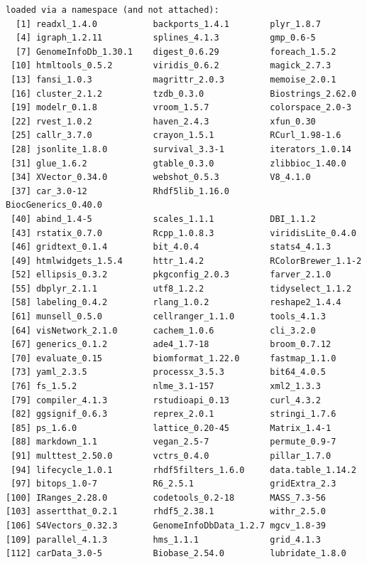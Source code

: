 \documentclass[
  12pt,
  openany]{book}
\begin{document}
\begin{verbatim}
loaded via a namespace (and not attached):
  [1] readxl_1.4.0           backports_1.4.1        plyr_1.8.7            
  [4] igraph_1.2.11          splines_4.1.3          gmp_0.6-5             
  [7] GenomeInfoDb_1.30.1    digest_0.6.29          foreach_1.5.2         
 [10] htmltools_0.5.2        viridis_0.6.2          magick_2.7.3          
 [13] fansi_1.0.3            magrittr_2.0.3         memoise_2.0.1         
 [16] cluster_2.1.2          tzdb_0.3.0             Biostrings_2.62.0     
 [19] modelr_0.1.8           vroom_1.5.7            colorspace_2.0-3      
 [22] rvest_1.0.2            haven_2.4.3            xfun_0.30             
 [25] callr_3.7.0            crayon_1.5.1           RCurl_1.98-1.6        
 [28] jsonlite_1.8.0         survival_3.3-1         iterators_1.0.14      
 [31] glue_1.6.2             gtable_0.3.0           zlibbioc_1.40.0       
 [34] XVector_0.34.0         webshot_0.5.3          V8_4.1.0              
 [37] car_3.0-12             Rhdf5lib_1.16.0        BiocGenerics_0.40.0   
 [40] abind_1.4-5            scales_1.1.1           DBI_1.1.2             
 [43] rstatix_0.7.0          Rcpp_1.0.8.3           viridisLite_0.4.0     
 [46] gridtext_0.1.4         bit_4.0.4              stats4_4.1.3          
 [49] htmlwidgets_1.5.4      httr_1.4.2             RColorBrewer_1.1-2    
 [52] ellipsis_0.3.2         pkgconfig_2.0.3        farver_2.1.0          
 [55] dbplyr_2.1.1           utf8_1.2.2             tidyselect_1.1.2      
 [58] labeling_0.4.2         rlang_1.0.2            reshape2_1.4.4        
 [61] munsell_0.5.0          cellranger_1.1.0       tools_4.1.3           
 [64] visNetwork_2.1.0       cachem_1.0.6           cli_3.2.0             
 [67] generics_0.1.2         ade4_1.7-18            broom_0.7.12          
 [70] evaluate_0.15          biomformat_1.22.0      fastmap_1.1.0         
 [73] yaml_2.3.5             processx_3.5.3         bit64_4.0.5           
 [76] fs_1.5.2               nlme_3.1-157           xml2_1.3.3            
 [79] compiler_4.1.3         rstudioapi_0.13        curl_4.3.2            
 [82] ggsignif_0.6.3         reprex_2.0.1           stringi_1.7.6         
 [85] ps_1.6.0               lattice_0.20-45        Matrix_1.4-1          
 [88] markdown_1.1           vegan_2.5-7            permute_0.9-7         
 [91] multtest_2.50.0        vctrs_0.4.0            pillar_1.7.0          
 [94] lifecycle_1.0.1        rhdf5filters_1.6.0     data.table_1.14.2     
 [97] bitops_1.0-7           R6_2.5.1               gridExtra_2.3         
[100] IRanges_2.28.0         codetools_0.2-18       MASS_7.3-56           
[103] assertthat_0.2.1       rhdf5_2.38.1           withr_2.5.0           
[106] S4Vectors_0.32.3       GenomeInfoDbData_1.2.7 mgcv_1.8-39           
[109] parallel_4.1.3         hms_1.1.1              grid_4.1.3            
[112] carData_3.0-5          Biobase_2.54.0         lubridate_1.8.0       
\end{verbatim}

  
\end{document}
